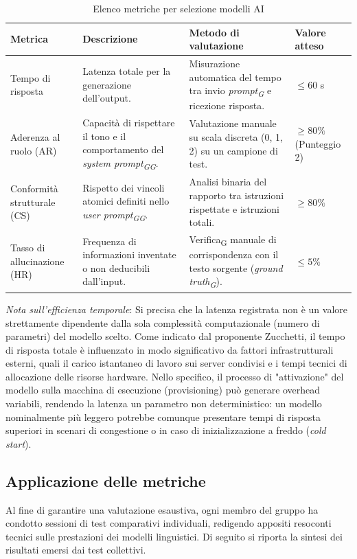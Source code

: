 \documentclass[11pt,a4paper]{article}
\newcommand{\gls}[1]{#1\textsubscript{G}}
\begin{document}
\begin{table}[H]
\centering
\renewcommand{\arraystretch}{1.5}
\begin{tabular}{|M{0.22\textwidth}|M{0.28\textwidth}|M{0.28\textwidth}|M{0.18\textwidth}|}
\hline
\textbf{Metrica} & \textbf{Descrizione} & \textbf{Metodo di valutazione} & \textbf{Valore atteso} \\
\hline
    Tempo di risposta & Latenza totale per la generazione dell'output. & Misurazione automatica del tempo tra invio \textit{\gls{prompt}} e ricezione risposta. & $\le 60$ s \\
    \hline
    Aderenza al ruolo (AR) & Capacità di rispettare il tono e il comportamento del \textit{\gls{system \gls{prompt}}}. & Valutazione manuale su scala discreta (0, 1, 2) su un campione di test. & $\ge 80\%$ (Punteggio 2) \\
    \hline
    Conformità strutturale (CS) & Rispetto dei vincoli atomici definiti nello \textit{\gls{user \gls{prompt}}}. & Analisi binaria del rapporto tra istruzioni rispettate e istruzioni totali. & $\ge 80\%$ \\
    \hline
    Tasso di allucinazione (HR) & Frequenza di informazioni inventate o non deducibili dall'input. & \gls{Verifica} manuale di corrispondenza con il testo sorgente (\textit{\gls{ground truth}}). & $\le 5\%$ \\
    \hline
\end{tabular}
\caption{Elenco metriche per selezione modelli AI}
\end{table}

\textit{Nota sull'efficienza temporale}: Si precisa che la latenza registrata non è un valore strettamente dipendente dalla sola complessità computazionale (numero di parametri) del modello scelto. Come indicato dal proponente Zucchetti, il tempo di risposta totale è influenzato in modo significativo da fattori infrastrutturali esterni, quali il carico istantaneo di lavoro sui server condivisi e i tempi tecnici di allocazione delle risorse hardware. Nello specifico, il processo di "attivazione" del modello sulla macchina di esecuzione (provisioning) può generare overhead variabili, rendendo la latenza un parametro non deterministico: un modello nominalmente più leggero potrebbe comunque presentare tempi di risposta superiori in scenari di congestione o in caso di inizializzazione a freddo (\textit{cold start}).

\subsection{Applicazione delle metriche}
Al fine di garantire una valutazione esaustiva, ogni membro del gruppo ha condotto sessioni di test comparativi individuali, redigendo appositi resoconti tecnici sulle prestazioni dei modelli linguistici.
Di seguito si riporta la sintesi dei risultati emersi dai test collettivi.
\end{document}
